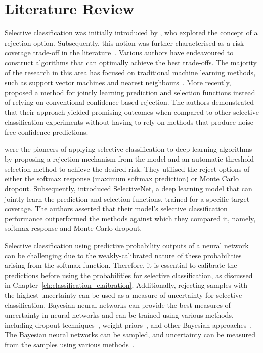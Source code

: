 \section{Literature Review}
\label{sec:selective_review}
Selective classification was initially introduced by \cite{chow1957optimum}, who explored the concept of a rejection option. Subsequently, this notion was further characterised as a risk-coverage trade-off in the literature~\citep{el2010foundations}. Various authors have endeavoured to construct algorithms that can optimally achieve the best trade-offs. The majority of the research in this area has focused on traditional machine learning methods, such as support vector machines and nearest neighbours~\citep{hellman1970nearest,fumera2002support,wiener2015agnostic}. More recently, \cite{cortes2016learning} proposed a method for jointly learning prediction and selection functions instead of relying on conventional confidence-based rejection. The authors demonstrated that their approach yielded promising outcomes when compared to other selective classification experiments without having to rely on methods that produce noise-free confidence predictions.

\cite{geifman2017selective} were the pioneers of applying selective classification to deep learning algorithms by proposing a rejection mechanism from the model and an automatic threshold selection method to achieve the desired risk. They utilised the reject options of either the softmax response (maximum softmax prediction) or Monte Carlo dropout. Subsequently, \cite{selective2019geifman} introduced SelectiveNet, a deep learning model that can jointly learn the prediction and selection functions, trained for a specific target coverage. The authors asserted that their model's selective classification performance outperformed the methods against which they compared it, namely, softmax response and Monte Carlo dropout.

Selective classification using predictive probability outputs of a neural network can be challenging due to the weakly-calibrated nature of these probabilities arising from the softmax function. Therefore, it is essential to calibrate the predictions before using the probabilities for selective classification, as discussed in Chapter~\ref{ch:classification_claibration}. Additionally, rejecting samples with the highest uncertainty can be used as a measure of uncertainty for selective classification. Bayesian neural networks can provide the best measures of uncertainty in neural networks and can be trained using various methods, including dropout techniques~\citep{gal2016dropout}, weight priors~\citep{blundell2015weight}, and other Bayesian approaches~\citep{mackay1992bayesian}. The Bayesian neural networks can be sampled, and uncertainty can be measured from the samples using various methods~\citep{Gal2016Uncertainty}.



